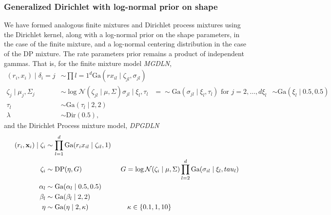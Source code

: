 \subsubsection{Generalized Dirichlet with log-normal prior on shape}
We have formed analogous finite mixtures and Dirichlet process mixtures using the Dirichlet kernel,
  along with a log-normal prior on the shape parameters, in the case of the finite mixture, and a
  log-normal centering distribution in the case of the DP mixture.  The rate parameters prior remains
  a product of independent gammas.  That is, for the finite mixture model \emph{MGDLN},
  \begin{equation}
    \begin{aligned}
      (r_i, x_i) \mid \delta_i=j &\sim \prod{l = 1}^d\text{Ga}(rx_{il}\mid \zeta_{jl}, \sigma_{jl})\\
      \zeta_{j} \mid \mu_j, \Sigma_j &\sim \log\mathcal{N}(\zeta_{jl}\mid \mu,\Sigma)
      \sigma_{jl} \mid \xi_l, \tau_l &=\sim \text{Ga}(\sigma_{jl}\mid \xi_l, \tau_l)
                                                                \text{ for }j = 2,\ldots,d
      \xi_l &\sim \text{Ga}(\xi_l\mid 0.5, 0.5)\\
      \tau_l &\sim \text{Ga}(\tau_l\mid 2, 2)\\
      \lambda &\sim \text{Dir}(0.5),
    \end{aligned}
  \end{equation}
  and the Dirichlet Process mixture model, \emph{DPGDLN}
  \begin{equation}
    \begin{aligned}
      (r_i, {\bf x}_i) \mid \zeta_i &\sim \prod_{l = 1}^d\text{Ga}(r_ix_{il}\mid \zeta_{il}, 1)\\
        \zeta_i &\sim \text{DP}(\eta, G)\hspace{2cm}G = \log\mathcal{N}(\zeta_i\mid\mu,\Sigma)
                                          \prod_{l = 2}^d \text{Ga}(\sigma_{il}\mid \xi_l,tau_l)\\
        \alpha_l &\sim \text{Ga}(\alpha_l \mid 0.5, 0.5)\\
        \beta_l &\sim \text{Ga}(\beta_l \mid 2, 2)\\
        \eta &\sim \text{Ga}(\eta \mid 2, \kappa) \hspace{2cm}\kappa \in \lbrace 0.1, 1, 10\rbrace
    \end{aligned}
  \end{equation}
  







